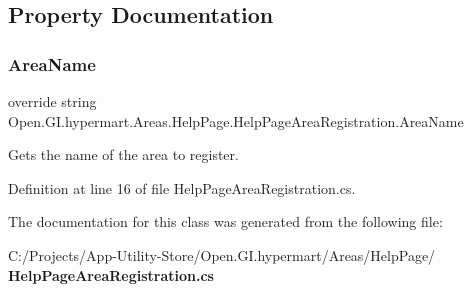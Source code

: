 \subsection{Property Documentation}
\mbox{\label{class_open_1_1_g_i_1_1hypermart_1_1_areas_1_1_help_page_1_1_help_page_area_registration_a98b4d777a4852021b9a120b1eb5cd08a}} 
\subsubsection{Area\+Name}
{\footnotesize\ttfamily override string Open.\+G\+I.\+hypermart.\+Areas.\+Help\+Page.\+Help\+Page\+Area\+Registration.\+Area\+Name\hspace{0.3cm}{\ttfamily [get]}}



Gets the name of the area to register. 



Definition at line 16 of file Help\+Page\+Area\+Registration.\+cs.



The documentation for this class was generated from the following file\+:\begin{DoxyCompactItemize}
\item 
C\+:/\+Projects/\+App-\/\+Utility-\/\+Store/\+Open.\+G\+I.\+hypermart/\+Areas/\+Help\+Page/\textbf{ Help\+Page\+Area\+Registration.\+cs}\end{DoxyCompactItemize}
